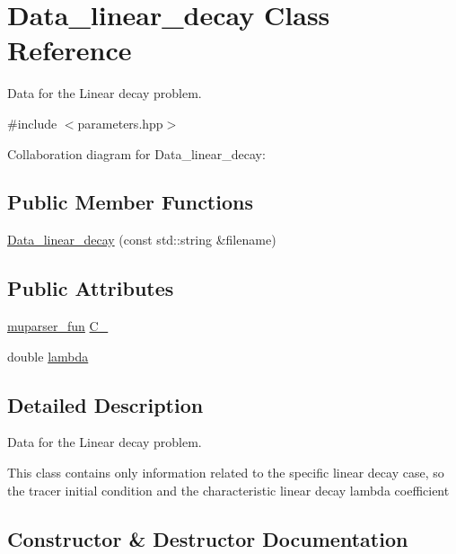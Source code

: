 \hypertarget{classData__linear__decay}{}\section{Data\+\_\+linear\+\_\+decay Class Reference}
\label{classData__linear__decay}


Data for the Linear decay problem.  




{\ttfamily \#include $<$parameters.\+hpp$>$}



Collaboration diagram for Data\+\_\+linear\+\_\+decay\+:
\subsection*{Public Member Functions}
\begin{DoxyCompactItemize}
\item 
\hyperlink{classData__linear__decay_a0ceea800cc1949c8fd20b78f073de38a}{Data\+\_\+linear\+\_\+decay} (const std\+::string \&filename)
\end{DoxyCompactItemize}
\subsection*{Public Attributes}
\begin{DoxyCompactItemize}
\item 
\hyperlink{classmuparser__fun}{muparser\+\_\+fun} \hyperlink{classData__linear__decay_a5d20ff72dec9169f01f0468cd5ce3d1b}{C\+\_}
\item 
double \hyperlink{classData__linear__decay_a30addcafe68743155a59fe9f7db4f15b}{lambda}
\end{DoxyCompactItemize}


\subsection{Detailed Description}
Data for the Linear decay problem. 

This class contains only information related to the specific linear decay case, so the tracer initial condition and the characteristic linear decay lambda coefficient 

\subsection{Constructor \& Destructor Documentation}
\mbox{\label{classData__linear__decay_a0ceea800cc1949c8fd20b78f073de38a}} 
